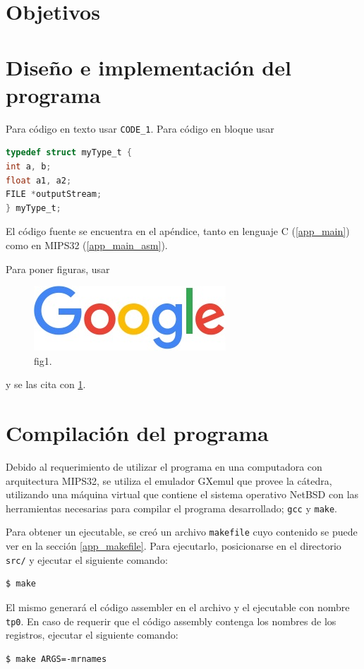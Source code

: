 \section{Objetivos}

\section{Diseño e implementación del programa}
Para código en texto usar \texttt{CODE\_1}.
Para código en bloque usar
\begin{lstlisting}[language=C, style=StyleC]
typedef struct myType_t {
int a, b;
float a1, a2;
FILE *outputStream;
} myType_t;
\end{lstlisting}

El código fuente se encuentra en el apéndice, tanto en lenguaje C (\ref{app_main}) como en MIPS32 (\ref{app_main_asm}).

Para poner figuras, usar
\begin{figure}[ht]
	\centering
	\includegraphics[scale=0.5]{./includes/fig1.jpg}
	\caption{fig1.}
	\label{fig1}
\end{figure}
y se las cita con \ref{fig1}.
\section{Compilación del programa}

Debido al requerimiento de utilizar el programa en una computadora con arquitectura MIPS32, se utiliza el emulador GXemul que provee la cátedra, utilizando una máquina virtual que contiene el sistema operativo NetBSD con las herramientas necesarias para compilar el programa desarrollado; \texttt{gcc} y \texttt{make}.

Para obtener un ejecutable, se creó un archivo \texttt{makefile} cuyo contenido se puede ver en la sección \ref{app_makefile}. Para ejecutarlo, posicionarse en el directorio \texttt{src/} y ejecutar el siguiente comando:
\begin{lstlisting}
$ make
\end{lstlisting}
El mismo generará el código assembler en el archivo  y el ejecutable con nombre \texttt{tp0}. En caso de requerir que el código assembly contenga los nombres de los registros, ejecutar el siguiente comando:
\begin{lstlisting}
$ make ARGS=-mrnames
\end{lstlisting}

